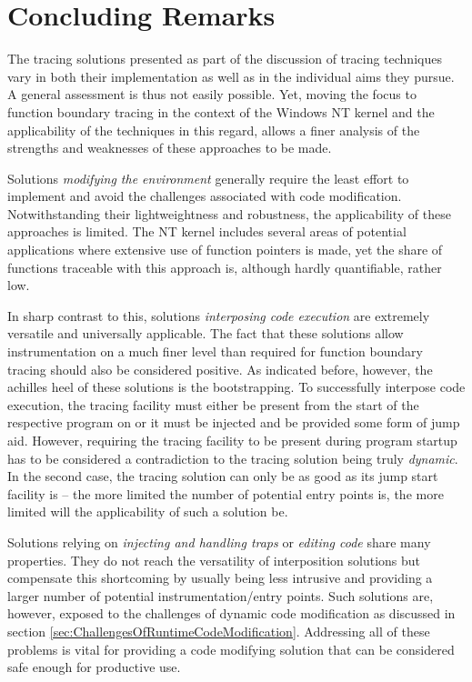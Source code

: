 \section{Concluding Remarks}
The tracing solutions presented as part of the discussion of 
tracing techniques vary in both their implementation as well as in the individual aims they pursue.
A general assessment is thus not easily possible. Yet, moving the focus
to function boundary tracing in the context of the Windows NT kernel and the applicability
of the techniques in this regard, allows a finer analysis of the strengths and weaknesses 
of these approaches to be made.

Solutions \emph{modifying the environment} generally require the least effort
to implement and avoid the challenges associated with code modification. 
Notwithstanding their lightweightness and robustness,
the applicability of these approaches is limited. The NT kernel includes 
several areas of potential applications \cite{Skywing07} where extensive 
use of function pointers is made, yet the share of functions traceable 
with this approach is, although hardly quantifiable, rather low. 

In sharp contrast to this, solutions \emph{interposing code execution}
are extremely versatile and universally applicable. The fact that
these solutions allow instrumentation on a much finer level than required
for function boundary tracing should also be considered positive. As
indicated before, however, the achilles heel of these solutions is
the bootstrapping. To successfully interpose code execution, the
tracing facility must either be present from the start of the respective
program on or it must be injected and be provided some form of jump aid. 
However, requiring the tracing facility to be present during program startup
has to be considered a contradiction to the tracing solution being truly \emph{dynamic}. In
the second case, the tracing solution can only be as good as its jump
start facility is -- the more limited the number of potential entry points
is, the more limited will the applicability of such a solution be.


Solutions relying on \emph{injecting and handling traps} or \emph{editing code} 
share many properties. They do not reach the versatility
of interposition solutions but compensate this shortcoming by usually being
less intrusive and providing a larger number of potential instrumentation/entry points.
Such solutions are, however, exposed to the challenges of dynamic 
code modification as discussed in section 
\ref{sec:ChallengesOfRuntimeCodeModification}. Addressing all of these
problems is vital for providing a code modifying solution that can be considered safe
enough for productive use.

